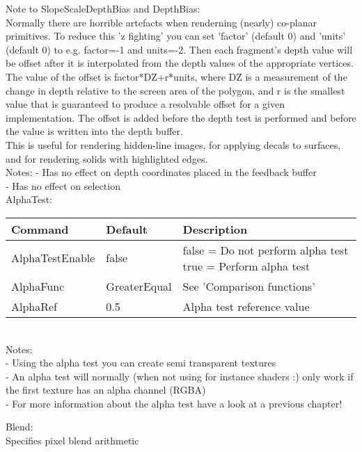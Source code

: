 Note to SlopeScaleDepthBias and DepthBias:\\
Normally there are horrible artefacts when renderning (nearly) co-planar primitives.
To reduce this 'z fighting' you can set 'factor' (default 0) and 'units' (default 0) to
e.g. factor=-1 and units=-2.
Then each fragment's depth value will be offset after it is interpolated from the
depth values of the appropriate vertices. The value of the offset is factor*DZ+r*units,
where DZ is a measurement of the change in depth relative to the screen area of the
polygon, and r is the smallest value that is guaranteed to produce a resolvable offset
for a given implementation. The offset is added before the depth test is performed and
before the value is written into the depth buffer.\\
This is useful for rendering hidden-line images, for applying decals to
surfaces, and for rendering solids with highlighted edges.\\
Notes: - Has no effect on depth coordinates placed in the feedback buffer\\
       - Has no effect on selection\\


AlphaTest:\\
\begin{tabular}{|p{4.5cm}|p{3.5cm}|p{9cm}|}
\hline
\textbf{Command} & \textbf{Default}  & \textbf{Description}\\
\hline
AlphaTestEnable      & false         & false = Do not perform alpha test\newline
                                       true  = Perform alpha test\\
\hline
AlphaFunc            & GreaterEqual  & See 'Comparison functions'\\
\hline
AlphaRef             & 0.5           & Alpha test reference value\\
\hline
\end{tabular}\\

Notes:\\
- Using the alpha test you can create semi transparent textures\\
- An alpha test will normally (when not using for instance shaders :) only work if the first texture
has an alpha channel (RGBA)\\
- For more information about the alpha test have a look at a previous chapter!


Blend:\\
Specifies pixel blend arithmetic\\

